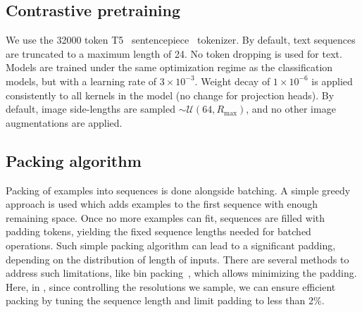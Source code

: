 \begin{table}[h]
{
}
  \label{tbl:pretraining_spec}
\end{table}


\subsection{Contrastive pretraining}
\label{app:contrastive_deets}
We use the 32000 token T5~\cite{t5paper} sentencepiece~\cite{kudo-richardson-2018-sentencepiece} tokenizer. By default, text sequences are truncated to a maximum length of 24.  No token dropping is used for text.
Models are trained under the same optimization regime as the classification models, but with a learning rate of $3 \times 10^{-3}$. Weight decay of $1 \times 10^{-6}$ is applied consistently to all kernels in the model (no change for projection heads).
By default, image side-lengths are sampled $\sim \mathcal{U}(64, R_\mathrm{max})$, and no other image augmentations are applied.

\subsection{Packing algorithm}
\label{app:packing}
Packing of examples into sequences is done alongside batching. A simple greedy approach is used which adds examples to the first sequence with enough remaining space. Once no more examples can fit, sequences are filled with padding tokens, yielding the fixed sequence lengths needed for batched operations. Such simple packing algorithm can lead to a significant padding, depending on the distribution of length of inputs. There are several methods to address such limitations, like bin packing~\citep{krell2021efficient}, which allows minimizing the padding. Here, in \navit, since controlling the resolutions we sample, we can ensure efficient packing by tuning the sequence length and limit padding to less than 2\%.


